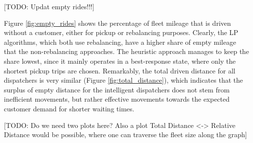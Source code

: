 
[TODO: Updat empty rides!!!]

Figure \ref{fig:empty_rides} shows the percentage of fleet mileage that is driven
without a customer, either for pickup or rebalancing purposes. Clearly, the LP
algorithms, which both use rebalancing, have a higher share of empty mileage
that the non-rebalancing approaches. The heuristic approach manages to keep the
share lowest, since it mainly operates in a best-response state, where only the
shortest pickup trips are chosen. Remarkably, the total driven distance for all
dispatchers is very similar (Figure \ref{fig:total_distance}), which indicates
that the surplus of empty distance for the intelligent dispatchers does not stem
from inefficient movements, but rather effective movements towards the expected
customer demand for shorter waiting times.

[TODO: Do we need two plots here? Also a plot Total Distance <-> Relative Distance
would be possible, where one can traverse the fleet size along the graph]



